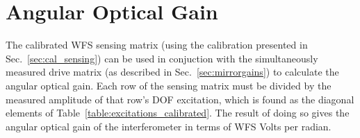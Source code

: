 \section{Angular Optical Gain}
\label{sec:cal_opticalgain}
The calibrated WFS sensing matrix (using the calibration presented in
Sec.~\ref{sec:cal_sensing}) can be used in conjuction with the
simultaneously measured drive matrix (as described in
Sec.~\ref{sec:mirrorgains}) to calculate the angular optical
gain. Each row of the sensing matrix must be divided by the measured
amplitude of that row's DOF excitation, which is found as the diagonal
elements of Table~\ref{table:excitations_calibrated}. The result of
doing so gives the angular optical gain of the interferometer in terms
of WFS Volts per radian.
